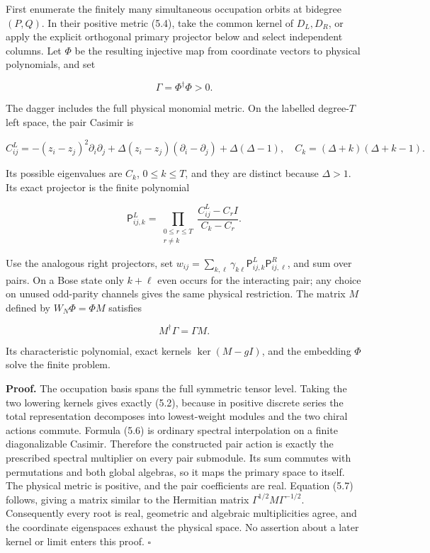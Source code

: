 \documentclass[a4paper,11pt]{article}
\numberwithin{equation}{section}
\begin{document}
First enumerate the finitely many simultaneous occupation orbits at bidegree \((P,Q)\). In their positive metric (5.4), take the common kernel of \(D_L,D_R\), or apply the explicit orthogonal primary projector below and select independent columns. Let \(\Phi\) be the resulting injective map from coordinate vectors to physical polynomials, and set

\[
\Gamma=\Phi^\dagger\Phi>0.
\]

The dagger includes the full physical monomial metric. On the labelled degree-\(T\) left space, the pair Casimir is

\[
C_{ij}^L=-(z_i-z_j)^2\partial_i\partial_j
+\Delta(z_i-z_j)(\partial_i-\partial_j)+\Delta(\Delta-1),
\quad C_k=(\Delta+k)(\Delta+k-1).
\tag{5.5}
\]

Its possible eigenvalues are \(C_k\), \(0\le k\le T\), and they are distinct because \(\Delta>1\). Its exact projector is the finite polynomial

\[
\mathsf P_{ij,k}^L
=\prod_{\substack{0\le r\le T\\r\ne k}}
\frac{C_{ij}^L-C_rI}{C_k-C_r}.
\tag{5.6}
\]

Use the analogous right projectors, set \(w_{ij}=\sum_{k,\ell}\gamma_{k\ell}\mathsf P^L_{ij,k}\mathsf P^R_{ij,\ell}\), and sum over pairs. On a Bose state only \(k+\ell\) even occurs for the interacting pair; any choice on unused odd-parity channels gives the same physical restriction. The matrix \(M\) defined by \(W_N\Phi=\Phi M\) satisfies

\[
M^\dagger\Gamma=\Gamma M.
\tag{5.7}
\]

Its characteristic polynomial, exact kernels \(\ker(M-gI)\), and the embedding \(\Phi\) solve the finite problem.

\textbf{Proof.} The occupation basis spans the full symmetric tensor level. Taking the two lowering kernels gives exactly (5.2), because in positive discrete series the total representation decomposes into lowest-weight modules and the two chiral actions commute. Formula (5.6) is ordinary spectral interpolation on a finite diagonalizable Casimir. Therefore the constructed pair action is exactly the prescribed spectral multiplier on every pair submodule. Its sum commutes with permutations and both global algebras, so it maps the primary space to itself. The physical metric is positive, and the pair coefficients are real. Equation (5.7) follows, giving a matrix similar to the Hermitian matrix \(\Gamma^{1/2}M\Gamma^{-1/2}\). Consequently every root is real, geometric and algebraic multiplicities agree, and the coordinate eigenspaces exhaust the physical space. No assertion about a later kernel or limit enters this proof. \(\square\)
\end{document}
